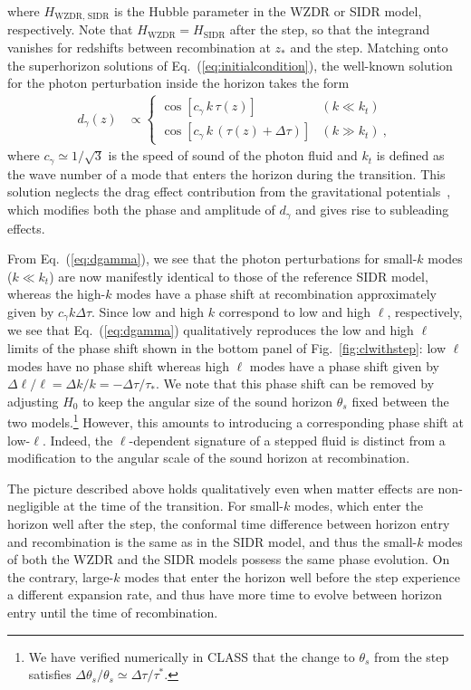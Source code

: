 \documentclass[aps,prd,twocolumn,nofootinbib,superscriptaddress]{revtex4}
\newcommand{\Eq}[1]{Eq.~(\ref{eq:#1})}
\begin{document}
where $H_\text{WZDR, SIDR}$ is the Hubble parameter in the WZDR or SIDR model, respectively. Note that $H_\text{WZDR}=H_\text{SIDR}$ after the step, so that the integrand vanishes for redshifts between recombination at $z_*$ and the step. Matching onto the superhorizon solutions of \Eq{initialcondition}, the well-known solution for the photon perturbation inside the horizon takes the form
\begin{align}
\label{eq:dgamma}
	d_\gamma(z) & \propto \begin{cases}
		\cos[c_\gamma \, k \, \tau(z)] & (k \ll k_t) \\
		\cos[c_\gamma \, k \, (\tau(z) + \Delta\tau)] & (k \gg k_t)
		~,
	\end{cases}
\end{align}
where $c_\gamma \simeq 1/\sqrt{3}$ is the speed of sound of the photon fluid and $k_t$ is defined as the wave number of a mode that enters the horizon during the transition. This solution neglects the drag effect contribution from the gravitational potentials~\cite{Bashinsky:2003tk,Baumann:2015rya}, which modifies both the phase and amplitude of $d_\gamma$ and gives rise to subleading effects. 
%

From \Eq{dgamma}, we see that the photon perturbations for small-$k$ modes ($k \ll k_t$) are now manifestly identical to those of the reference SIDR model, whereas the high-$k$ modes have a phase shift at recombination approximately given by $c_\gamma k \Delta \tau$. Since low and high $k$ correspond to low and high $\ell$, respectively, we see that \Eq{dgamma} qualitatively reproduces the low and high $\ell$ limits of the phase shift shown in the bottom panel of Fig.~\ref{fig:clwithstep}: low $\ell$ modes have no phase shift whereas high $\ell$ modes have a phase shift given by $\Delta \ell/\ell=\Delta k/k=-\Delta \tau/\tau_*$.
%
We note that this phase shift can be removed by adjusting $H_0$ to keep the angular size of the sound horizon $\theta_s$ fixed between the two models.\footnote{We have verified numerically in CLASS that the change to $\theta_s$ from the step satisfies $\Delta\theta_s/\theta_s \simeq \Delta\tau /\tau^*$.} However, this amounts to introducing a corresponding phase shift at low-$\ell$. Indeed, the $\ell$-dependent signature of a stepped fluid is distinct from a modification to the angular scale of the sound horizon at recombination.  

The picture described above holds qualitatively even when matter effects are non-negligible at the time of the transition. For small-$k$ modes, which enter the horizon well after the step, the conformal time difference between horizon entry and recombination is the same as in the SIDR model, and thus the small-$k$ modes of both the WZDR and the SIDR models possess the same phase evolution.  On the contrary, large-$k$ modes that enter the horizon well before the step experience a different expansion rate, and thus have more time to evolve between horizon entry until the time of recombination. 
\end{document}

